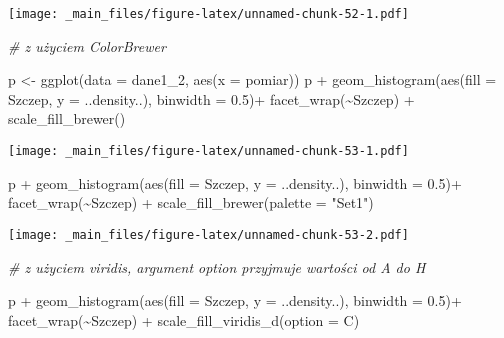 \documentclass[
]{book}
\newenvironment{Shaded}{\begin{snugshade}}{\end{snugshade}}
\newcommand{\AttributeTok}[1]{\textcolor[rgb]{0.77,0.63,0.00}{#1}}
\newcommand{\CommentTok}[1]{\textcolor[rgb]{0.56,0.35,0.01}{\textit{#1}}}
\newcommand{\FloatTok}[1]{\textcolor[rgb]{0.00,0.00,0.81}{#1}}
\newcommand{\FunctionTok}[1]{\textcolor[rgb]{0.00,0.00,0.00}{#1}}
\newcommand{\NormalTok}[1]{#1}
\newcommand{\OtherTok}[1]{\textcolor[rgb]{0.56,0.35,0.01}{#1}}
\newcommand{\SpecialCharTok}[1]{\textcolor[rgb]{0.00,0.00,0.00}{#1}}
\newcommand{\StringTok}[1]{\textcolor[rgb]{0.31,0.60,0.02}{#1}}
\begin{document}
\texttt{[image: \_main\_files/figure-latex/unnamed-chunk-52-1.pdf]}

\begin{Shaded}
\begin{Highlighting}[]
\CommentTok{\# z użyciem ColorBrewer}

\NormalTok{p }\OtherTok{\textless{}{-}} \FunctionTok{ggplot}\NormalTok{(}\AttributeTok{data =}\NormalTok{ dane1\_2, }\FunctionTok{aes}\NormalTok{(}\AttributeTok{x =}\NormalTok{ pomiar))}
\NormalTok{p }\SpecialCharTok{+} \FunctionTok{geom\_histogram}\NormalTok{(}\FunctionTok{aes}\NormalTok{(}\AttributeTok{fill =}\NormalTok{ Szczep, }\AttributeTok{y =}\NormalTok{ ..density..), }\AttributeTok{binwidth =} \FloatTok{0.5}\NormalTok{)}\SpecialCharTok{+}
  \FunctionTok{facet\_wrap}\NormalTok{(}\SpecialCharTok{\textasciitilde{}}\NormalTok{Szczep) }\SpecialCharTok{+} \FunctionTok{scale\_fill\_brewer}\NormalTok{()}
\end{Highlighting}
\end{Shaded}

\texttt{[image: \_main\_files/figure-latex/unnamed-chunk-53-1.pdf]}

\begin{Shaded}
\begin{Highlighting}[]
\NormalTok{p }\SpecialCharTok{+} \FunctionTok{geom\_histogram}\NormalTok{(}\FunctionTok{aes}\NormalTok{(}\AttributeTok{fill =}\NormalTok{ Szczep, }\AttributeTok{y =}\NormalTok{ ..density..), }\AttributeTok{binwidth =} \FloatTok{0.5}\NormalTok{)}\SpecialCharTok{+}
  \FunctionTok{facet\_wrap}\NormalTok{(}\SpecialCharTok{\textasciitilde{}}\NormalTok{Szczep) }\SpecialCharTok{+} \FunctionTok{scale\_fill\_brewer}\NormalTok{(}\AttributeTok{palette =} \StringTok{"Set1"}\NormalTok{)}
\end{Highlighting}
\end{Shaded}

\texttt{[image: \_main\_files/figure-latex/unnamed-chunk-53-2.pdf]}

\begin{Shaded}
\begin{Highlighting}[]
\CommentTok{\# z użyciem viridis, argument option przyjmuje wartości od A do H}

\NormalTok{p }\SpecialCharTok{+} \FunctionTok{geom\_histogram}\NormalTok{(}\FunctionTok{aes}\NormalTok{(}\AttributeTok{fill =}\NormalTok{ Szczep, }\AttributeTok{y =}\NormalTok{ ..density..), }\AttributeTok{binwidth =} \FloatTok{0.5}\NormalTok{)}\SpecialCharTok{+}
  \FunctionTok{facet\_wrap}\NormalTok{(}\SpecialCharTok{\textasciitilde{}}\NormalTok{Szczep) }\SpecialCharTok{+} \FunctionTok{scale\_fill\_viridis\_d}\NormalTok{(}\AttributeTok{option =} \StringTok{\textquotesingle{}C\textquotesingle{}}\NormalTok{)}
\end{Highlighting}
\end{Shaded}
\end{document}
